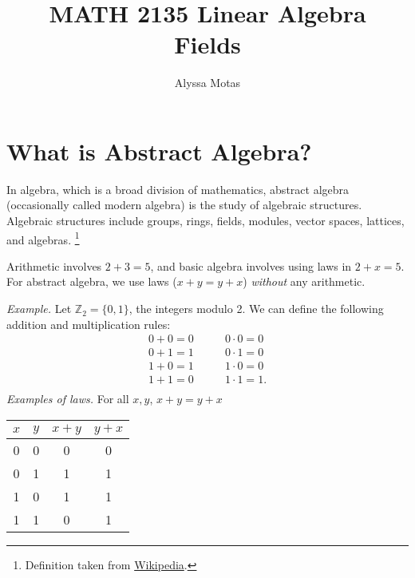 \documentclass[11pt]{article}
\title{\textbf{MATH 2135 Linear Algebra} \\ Fields}
\author{Alyssa Motas}
\begin{document}
    \maketitle

    \pagebreak

    \tableofcontents

    \pagebreak

    \section{What is Abstract Algebra?}

    In algebra, which is a broad division of mathematics, abstract algebra (occasionally called modern algebra) is the study of algebraic structures. Algebraic structures include groups, rings, fields, modules, vector spaces, lattices, and algebras. \footnote{Definition taken from \href{https://en.wikipedia.org/wiki/Abstract_algebra}{Wikipedia}.}

    \vspace{1em}

    Arithmetic involves \(2 + 3 = 5\), and basic algebra involves using laws in \(2 + x = 5\). For abstract algebra, we use laws (\(x + y = y + x\)) \emph{without} any arithmetic.

    \vspace{1em}

    \emph{Example.} Let \(\mathbb{Z}_2 = \{0,1\}\), the integers modulo 2. We can define the following addition and multiplication rules:
    \begin{align*}
        0 + 0 = 0 &\qquad 0 \cdot 0 = 0 \\
        0 + 1 = 1 &\qquad 0 \cdot 1 = 0 \\
        1 + 0 = 1 &\qquad 1 \cdot 0 = 0 \\
        1 + 1 = 0 &\qquad 1 \cdot 1 = 1. \\
    \end{align*}
    \emph{Examples of laws.} For all $x,y$, $x+y = y+x$

    \begin{center}
        \begin{tabular}{| c | c | c | c |} \hline
            $x$ & $y$ & $x + y$ & $y + x$ \\ \hline
            0   & 0   & 0       & 0       \\ \hline
            0   & 1   & 1       & 1       \\ \hline
            1   & 0   & 1       & 1       \\ \hline
            1   & 1   & 0       & 1       \\ \hline
        \end{tabular}
    \end{center}
\end{document}
